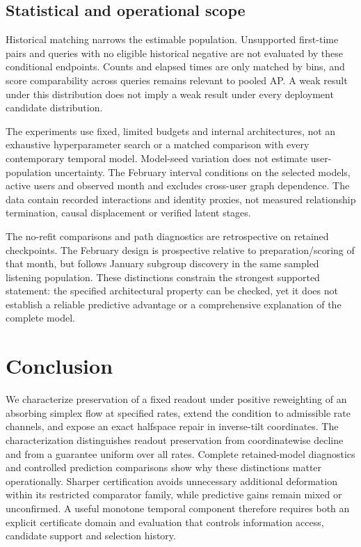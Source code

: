 \subsection{Statistical and operational scope}
Historical matching narrows the estimable population. Unsupported first-time pairs and queries with no eligible historical negative are not evaluated by these conditional endpoints. Counts and elapsed times are only matched by bins, and score comparability across queries remains relevant to pooled AP. A weak result under this distribution does not imply a weak result under every deployment candidate distribution.

The experiments use fixed, limited budgets and internal architectures, not an exhaustive hyperparameter search or a matched comparison with every contemporary temporal model. Model-seed variation does not estimate user-population uncertainty. The February interval conditions on the selected models, active users and observed month and excludes cross-user graph dependence. The data contain recorded interactions and identity proxies, not measured relationship termination, causal displacement or verified latent stages.

The no-refit comparisons and path diagnostics are retrospective on retained checkpoints. The February design is prospective relative to preparation/scoring of that month, but follows January subgroup discovery in the same sampled listening population. These distinctions constrain the strongest supported statement: the specified architectural property can be checked, yet it does not establish a reliable predictive advantage or a comprehensive explanation of the complete model.

\section{Conclusion}
We characterize preservation of a fixed readout under positive reweighting of an absorbing simplex flow at specified rates, extend the condition to admissible rate channels, and expose an exact halfspace repair in inverse-tilt coordinates. The characterization distinguishes readout preservation from coordinatewise decline and from a guarantee uniform over all rates. Complete retained-model diagnostics and controlled prediction comparisons show why these distinctions matter operationally. Sharper certification avoids unnecessary additional deformation within its restricted comparator family, while predictive gains remain mixed or unconfirmed. A useful monotone temporal component therefore requires both an explicit certificate domain and evaluation that controls information access, candidate support and selection history.

